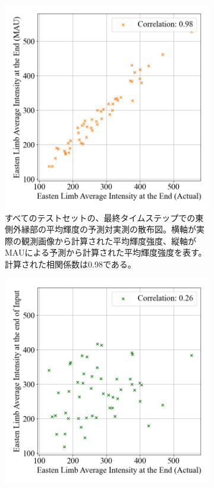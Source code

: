         \begin{figure}[htbp]
          \begin{subfigure}[b]{0.53\textwidth}
            \centering
            \includegraphics[width=\textwidth]{figures/exp1/limb_scatter_gt_pd.png}
            \caption{すべてのテストセットの、最終タイムステップでの東側外縁部の平均輝度の予測対実測の散布図。横軸が実際の観測画像から計算された平均輝度強度、縦軸がMAUによる予測から計算された平均輝度強度を表す。計算された相関係数は0.98である。}
          \end{subfigure}
          \begin{subfigure}[b]{0.55\textwidth}
            \centering
            \includegraphics[width=\textwidth]{figures/exp1/limb_scatter_gt_sp.png}

\end{subfigure}
\end{figure}
